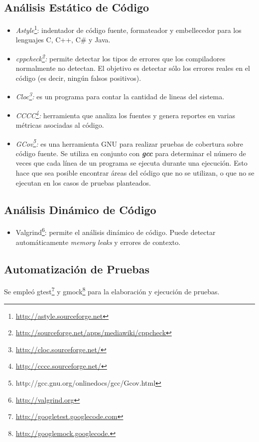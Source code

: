 \subsection{Análisis Estático de Código}
\begin{itemize}
 \item \emph{Astyle}\footnote{\url{http://astyle.sourceforge.net}}: indentador de código fuente, formateador y embellecedor para los lenguajes C, C++, C\# y Java.

 \item \emph{cppcheck\footnote{\url{http://sourceforge.net/apps/mediawiki/cppcheck}}:} permite detectar los tipos de errores que los compiladores normalmente no detectan. El objetivo es detectar sólo los errores reales en el código (es decir, ningún falsos positivos).

\item \emph{Cloc\footnote{\url{http://cloc.sourceforge.net/}}:} es un programa para contar la cantidad de lineas del sistema.

\item \emph{CCCC\footnote{\url{http://cccc.sourceforge.net/}}:} herramienta que analiza los fuentes y genera reportes en varias métricas asociadas al código.

\item \emph{GCov\footnote{http://gcc.gnu.org/onlinedocs/gcc/Gcov.html}:} es una herramienta GNU para realizar pruebas de cobertura sobre código fuente. Se utiliza en conjunto con \textbf{\textit{gcc}} para determinar el número de veces que cada línea de un programa se ejecuta durante una ejecución. Esto hace que sea posible encontrar áreas del código que no se utilizan, o que no se ejecutan en los casos de pruebas  planteados.

\end{itemize}

\subsection{Análisis Dinámico de Código}
\begin{itemize}
	\item Valgrind\footnote{\url{http://valgrind.org}}: permite el análisis dinámico de código. Puede detectar automáticamente \emph{memory leaks} y errores de contexto.
\end{itemize}

\subsection{Automatización de Pruebas}
Se empleó gtest\footnote{\url{http://googletest.googlecode.com}} y gmock\footnote{\url{http://googlemock.googlecode.}} para la elaboración y ejecución de pruebas.